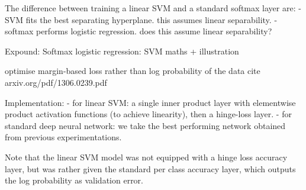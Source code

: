 \documentclass[a4paper,11pt]{article}
\begin{document}
The difference between training a linear SVM and a standard softmax layer are:
- SVM fits the best separating hyperplane. this assumes linear separability. 
- softmax performs logistic regression. does this assume linear separability?

Expound:
Softmax logistic regression: %
SVM maths + illustration

optimise margin-based loss rather than log probability of the data
{cite arxiv.org/pdf/1306.0239.pdf}

Implementation:
- for linear SVM: a single inner product layer with elementwise product activation functions (to achieve linearity), then a hinge-loss layer.
- for standard deep neural network: we take the best performing network obtained from previous experimentations.

Note that the linear SVM model was not equipped with a hinge loss accuracy layer, but was rather given the standard per class accuracy layer, which outputs the log probability as validation error. 
\end{document}
